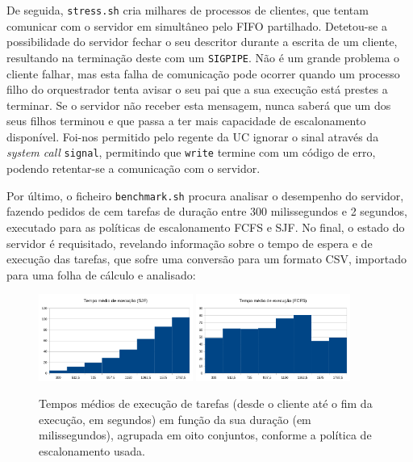 \documentclass[11pt]{article}
\begin{document}
De seguida, \texttt{stress.sh} cria milhares de processos de clientes, que tentam comunicar com o
servidor em simultâneo pelo FIFO partilhado. Detetou-se a possibilidade do servidor fechar o seu
descritor durante a escrita de um cliente, resultando na terminação deste com um \texttt{SIGPIPE}.
Não é um grande problema o cliente falhar, mas esta falha de comunicação pode ocorrer quando um
processo filho do orquestrador tenta avisar o seu pai que a sua execução está prestes a terminar.
Se o servidor não receber esta mensagem, nunca saberá que um dos seus filhos terminou e que passa a
ter mais capacidade de escalonamento disponível. Foi-nos permitido pelo regente da UC ignorar o
sinal através da \emph{system call} \texttt{signal}, permitindo que \texttt{write} termine com um
código de erro, podendo retentar-se a comunicação com o servidor.

Por último, o ficheiro \texttt{benchmark.sh} procura analisar o desempenho do servidor, fazendo
pedidos de cem tarefas de duração entre 300 milissegundos e 2 segundos, executado para as políticas
de escalonamento FCFS e SJF. No final, o estado do servidor é requisitado, revelando informação
sobre o tempo de espera e de execução das tarefas, que sofre uma conversão para um formato CSV,
importado para uma folha de cálculo e analisado:

\begin{figure}[H]
    \centering
    \includegraphics[width=0.45\textwidth]{report_figures/HistogramSJF.png}
    \includegraphics[width=0.45\textwidth]{report_figures/HistogramFCFS.png}
    \caption{Tempos médios de execução de tarefas (desde o cliente até o fim da execução, em
        segundos) em função da sua duração (em milissegundos), agrupada em oito conjuntos, conforme
        a política de escalonamento usada.}
\end{figure}
\end{document}
